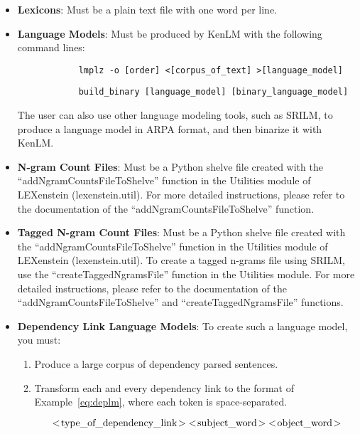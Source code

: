 \begin{itemize}
	\item \textbf{Lexicons}: Must be a plain text file with one word per line.
	
	\item \textbf{Language Models}: Must be produced by KenLM with the following command lines:

			\begin{lstlisting}
			lmplz -o [order] <[corpus_of_text] >[language_model]
			\end{lstlisting}
			\begin{lstlisting}
			build_binary [language_model] [binary_language_model]
			\end{lstlisting}
			
		The user can also use other language modeling tools, such as SRILM, to produce a language model in ARPA format, and then binarize it with KenLM.
			
	\item \textbf{N-gram Count Files}: Must be a Python shelve file created with the ``addNgramCountsFileToShelve'' function in the Utilities module of LEXenstein (lexenstein.util). For more detailed instructions, please refer to the documentation of the ``addNgramCountsFileToShelve'' function.
	
	\item \textbf{Tagged N-gram Count Files}: Must be a Python shelve file created with the ``addNgramCountsFileToShelve'' function in the Utilities module of LEXenstein (lexenstein.util). To create a tagged n-grams file using SRILM, use the ``createTaggedNgramsFile'' function in the Utilities module. For more detailed instructions, please refer to the documentation of the ``addNgramCountsFileToShelve'' and ``createTaggedNgramsFile'' functions.
	
	\item \textbf{Dependency Link Language Models}: To create such a language model, you must:
	
		\begin{enumerate}
			\item Produce a large corpus of dependency parsed sentences.
			\item Transform each and every dependency link to the format of Example~\ref{eq:deplm}, where each token is space-separated.
			
				\begin{equation}
				\label{eq:deplm}
				<\!\textup{type\_of\_dependency\_link}\!>\; <\!\textup{subject\_word}\!>\; <\!\textup{object\_word}\!>
				\end{equation}
				

\end{enumerate}
\end{itemize}

